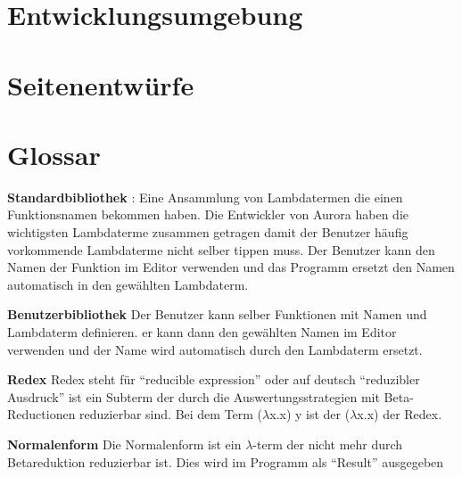 \documentclass[parskip=full,11pt,twoside]{scrartcl}
\begin{document}
 




\section{Entwicklungsumgebung}

\pagebreak
\appendix

\section{Seitenentwürfe}




\section{Glossar}

\textbf{Standardbibliothek} :
Eine Ansammlung von Lambdatermen die einen Funktionsnamen bekommen haben. Die Entwickler von Aurora haben die wichtigsten Lambdaterme zusammen getragen damit der Benutzer häufig vorkommende Lambdaterme nicht selber tippen muss. Der Benutzer kann den Namen der Funktion im Editor verwenden und das Programm ersetzt den Namen automatisch in den gewählten Lambdaterm.

\textbf{Benutzerbibliothek}
Der Benutzer kann selber Funktionen mit Namen und Lambdaterm definieren. er kann dann den gewählten Namen im Editor verwenden und der Name wird automatisch durch den Lambdaterm ersetzt.

\textbf {Redex}
Redex steht für \enquote{reducible expression} oder auf deutsch \enquote{reduzibler Ausdruck} ist ein Subterm der durch die Auswertungsstrategien mit Beta-Reductionen reduzierbar sind. 
Bei dem Term ($\lambda$x.x) y ist der ($\lambda$x.x) der Redex.

\textbf{Normalenform}
Die Normalenform ist ein $\lambda$-term der nicht mehr durch Betareduktion reduzierbar ist. Dies wird im Programm als \enquote{Result} ausgegeben
\end{document}
